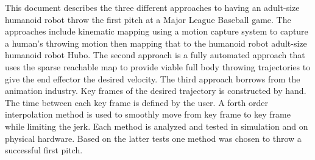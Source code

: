 This document describes the three different approaches to having an adult-size humanoid robot throw the first pitch at a Major League Baseball game.  The approaches include kinematic mapping using a motion capture system to capture a human's throwing motion then mapping that to the humanoid robot adult-size humanoid robot Hubo.  The second approach is a fully automated approach that uses the sparse reachable map to provide viable full body throwing trajectories to give the end effector the desired velocity.  The third approach borrows from the animation industry.  Key frames of the desired trajectory is constructed by hand.  The time between each key frame is defined by the user.  A forth order interpolation method is used to smoothly move from key frame to key frame while limiting the jerk.  Each method is analyzed and tested in simulation and on physical hardware.  Based on the latter tests one method was chosen to throw a successful first pitch.